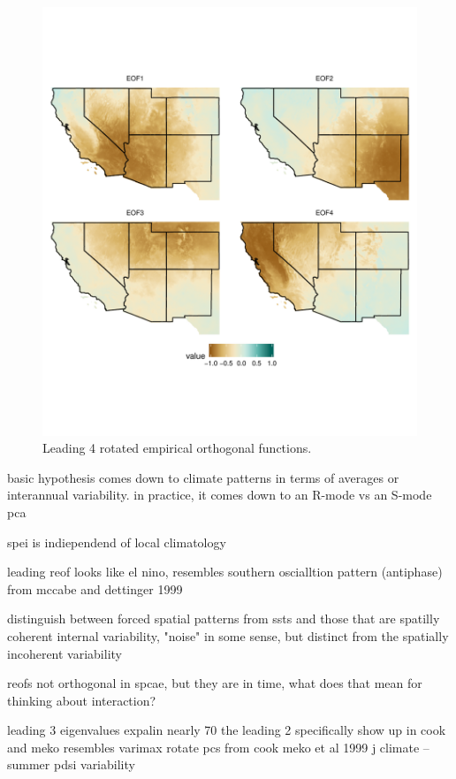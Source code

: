 \documentclass[fleqn,10pt]{wlscirep}
\begin{document}
\begin{figure}[ht]
\centering
\includegraphics[width=\linewidth]{figures/reof_observed.pdf}
\caption{Leading 4 rotated empirical orthogonal functions.}
\label{fig:reofs}
\end{figure}

basic hypothesis comes down to climate patterns in terms of averages or interannual variability. in practice, it comes down to an R-mode vs an S-mode pca

spei is indiependend of local climatology

leading reof looks like el nino, resembles southern oscialltion pattern (antiphase) from mccabe and dettinger 1999

distinguish between forced spatial patterns from ssts and those that are spatilly coherent internal variability, "noise" in some sense, but distinct from the spatially incoherent variability

reofs not orthogonal in spcae, but they are in time, what does that mean for thinking about interaction?

leading 3 eigenvalues expalin nearly 70%
the leading 2 specifically show up  in cook and meko
resembles varimax rotate pcs from cook meko et al 1999 j climate -- summer pdsi variability
\end{document}
